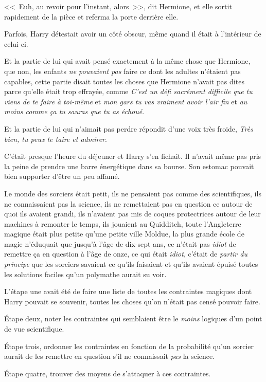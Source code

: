 <<~Euh, au revoir pour l'instant, alors~>>, dit Hermione, et elle sortit rapidement de la pièce et referma la porte derrière elle.

Parfois, Harry détestait avoir un côté obscur, même quand il était à l'intérieur de celui-ci.

Et la partie de lui qui avait pensé exactement à la même chose que Hermione, que non, les enfants \emph{ne pouvaient pas} faire ce dont les adultes n'étaient pas capables, cette partie disait toutes les choses que Hermione n'avait pas dites parce qu'elle était trop effrayée, comme \emph{C'est un défi sacrément difficile que tu viens de te faire à toi-même} et \emph{mon gars tu vas vraiment avoir l'air fin} et \emph{au moins comme ça tu sauras que tu as échoué}.

Et la partie de lui qui n'aimait pas perdre répondit d'une voix très froide, \emph{Très bien, tu peux te taire et admirer}.

\later

C'était presque l'heure du déjeuner et Harry s'en fichait. Il n'avait même pas pris la peine de prendre une barre énergétique dans sa bourse. Son estomac pouvait bien supporter d'être un peu affamé.

Le monde des sorciers était petit, ils ne pensaient pas comme des scientifiques, ils ne connaissaient pas la science, ils ne remettaient pas en question ce autour de quoi ils avaient grandi, ils n'avaient pas mis de coques protectrices autour de leur machines à remonter le temps, ils jouaient au Quidditch, toute l'Angleterre magique était plus petite qu'une petite ville Moldue, la plus grande école de magie n'éduquait que jusqu'à l'âge de dix-sept ans, ce n'était pas \emph{idiot} de remettre ça en question à l'âge de onze, ce qui était \emph{idiot}, c'était de \emph{partir du principe} que les sorciers savaient ce qu'ils faisaient et qu'ils avaient épuisé toutes les solutions faciles qu'un polymathe aurait su voir.

L'étape une avait été de faire une liste de toutes les contraintes magiques dont Harry pouvait se souvenir, toutes les choses qu'on n'était pas censé pouvoir faire.

Étape deux, noter les contraintes qui semblaient être le \emph{moins} logiques d'un point de vue scientifique.

Étape trois, ordonner les contraintes en fonction de la probabilité qu'un sorcier aurait de les remettre en question s'il ne connaissait \emph{pas} la science.

Étape quatre, trouver des moyens de s'attaquer à ces contraintes.

